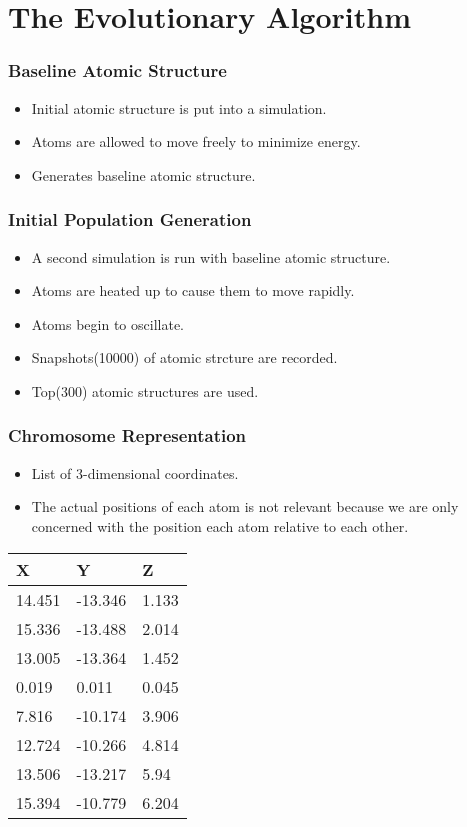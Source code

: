 \documentclass[]{beamer}
\begin{document}
\section{The Evolutionary Algorithm}

\begin{frame}
  \frametitle{Baseline Atomic Structure}

  \begin{itemize}
    \item Initial atomic structure is put into a simulation.
    \item Atoms are allowed to move freely to minimize energy.
    \item Generates baseline atomic structure.
  \end{itemize}
\end{frame}

\begin{frame}
  \frametitle{Initial Population Generation}

  \begin{itemize}
    \item A second simulation is run with baseline atomic structure.
    \item Atoms are heated up to cause them to move rapidly.
    \item Atoms begin to oscillate.
    \item Snapshots(10000) of atomic strcture are recorded.
    \item Top(300) atomic structures are used.
  \end{itemize}
\end{frame}

\begin{frame}
  \frametitle{Chromosome Representation}

  \begin{itemize}
    \item List of 3-dimensional coordinates.
    \item The actual positions of each atom is not relevant because we are only concerned with the position each atom relative to each other.
  \end{itemize}

  \begin{table}[htp]
  \centering
  \begin{tabular}{ | l | l | l |}
    \hline
      X & Y & Z \\ \hline
      14.451 & -13.346 & 1.133 \\ \hline
      15.336 & -13.488 & 2.014 \\ \hline
      13.005 & -13.364 & 1.452 \\ \hline
      0.019 & 0.011 & 0.045 \\ \hline
      7.816 & -10.174 & 3.906 \\ \hline
      12.724 & -10.266 & 4.814 \\ \hline
      13.506 & -13.217 & 5.94 \\ \hline
      15.394 & -10.779 & 6.204 \\ \hline
  \end{tabular}
  \end{table}

\end{frame}
\end{document}
